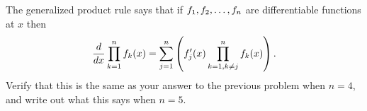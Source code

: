 \begin{exercises}
\exercise
  The {\dfont generalized product rule\/} 
says that if $\displaystyle f_1 , f_2 ,\ldots ,f_n$ are differentiable functions at
  $x$ then
$${d\over dx}\prod _{k=1 } ^n f_k(x) = 
\sum _{j=1 } ^n \left(f'_j (x) \prod _{k=1 , k\neq j} ^n
   f_k (x)\right).$$
Verify that this is the same as your answer to the previous problem
when $n=4$,
and write out what this says when $n=5$.


\end{exercises}

